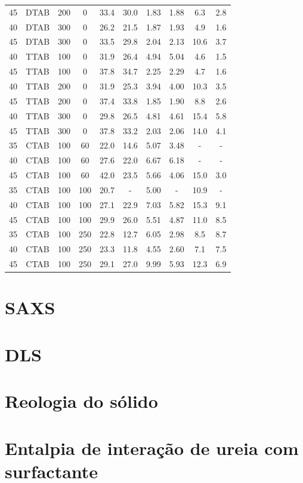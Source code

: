 \begin{longtable}[h]{cccccccccc}
			45 & DTAB & 200 & 0 & 33.4 & 30.0 & 1.83 & 1.88 & 6.3 &	2.8\\
			40 & DTAB & 300 & 0 & 26.2 & 21.5 & 1.87 & 1.93 & 4.9 &	1.6\\
			45 & DTAB & 300 & 0 & 33.5 & 29.8 & 2.04 & 2.13 & 10.6 & 3.7\\
			\midrule
			40 & TTAB & 100 & 0 & 31.9 & 26.4 & 4.94 & 5.04 & 4.6 &	1.5\\
			45 & TTAB & 100 & 0 & 37.8 & 34.7 & 2.25 & 2.29 & 4.7 &	1.6\\
			40 & TTAB & 200 & 0 & 31.9 & 25.3 & 3.94 & 4.00 & 10.3 & 3.5\\
			45 & TTAB & 200 & 0 & 37.4 & 33.8 & 1.85 & 1.90 & 8.8 &	2.6\\
			40 & TTAB & 300 & 0 & 29.8 & 26.5 & 4.81 & 4.61 & 15.4 & 5.8\\
			45 & TTAB & 300 & 0 & 37.8 & 33.2 & 2.03 & 2.06 & 14.0 & 4.1\\
			\midrule
			35 & CTAB & 100 & 60 & 22.0 & 14.6 & 5.07 & 3.48 & - & -\\
			40 & CTAB & 100 & 60 & 27.6 & 22.0 & 6.67 & 6.18 & - & -\\
			45 & CTAB & 100 & 60 & 42.0 & 23.5 & 5.66 & 4.06 & 15.0 & 3.0\\
			35 & CTAB & 100 & 100 & 20.7 & - & 5.00 & - & 10.9 & -\\
			40 & CTAB & 100 & 100 & 27.1 & 22.9 & 7.03 & 5.82 & 15.3 &	9.1\\
			45 & CTAB & 100 & 100 & 29.9 & 26.0 & 5.51 & 4.87 & 11.0 &	8.5\\*
			35 & CTAB & 100 & 250 & 22.8 & 12.7 & 6.05 & 2.98 & 8.5 &	8.7\\*
			40 & CTAB & 100 & 250 & 23.3 & 11.8 & 4.55 & 2.60 & 7.1 &	7.5\\*
			45 & CTAB & 100 & 250 & 29.1 & 27.0 & 9.99 & 5.93 & 12.3 &	6.9\\*
			\bottomrule

		\end{longtable}
		
		
		
	\section{SAXS}
	\section{DLS}
	\section{Reologia do sólido}
	\section{Entalpia de interação de ureia com surfactante}
